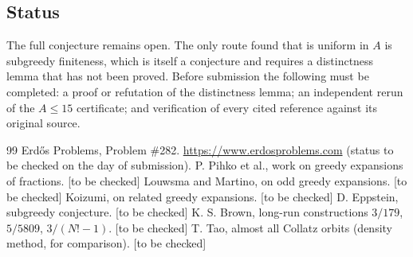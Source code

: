 \documentclass[11pt]{amsart}
\theoremstyle{plain}
\theoremstyle{definition}
\theoremstyle{remark}
\begin{document}
\subsection*{Status}

The full conjecture remains open. The only route found that is uniform in $A$ is subgreedy finiteness, which is itself a conjecture and requires a distinctness lemma that has not been proved. Before submission the following must be completed: a proof or refutation of the distinctness lemma; an independent rerun of the $A\le 15$ certificate; and verification of every cited reference against its original source.

\begin{thebibliography}{99}
 Erd\H{o}s Problems, Problem \#282. \url{https://www.erdosproblems.com} (status to be checked on the day of submission).
 P. Pihko et al., work on greedy expansions of fractions. [to be checked]
 Louwsma and Martino, on odd greedy expansions. [to be checked]
 Koizumi, on related greedy expansions. [to be checked]
 D. Eppstein, subgreedy conjecture. [to be checked]
 K. S. Brown, long-run constructions $3/179$, $5/5809$, $3/(N!-1)$. [to be checked]
 T. Tao, almost all Collatz orbits (density method, for comparison). [to be checked]
\end{thebibliography}
\end{document}
